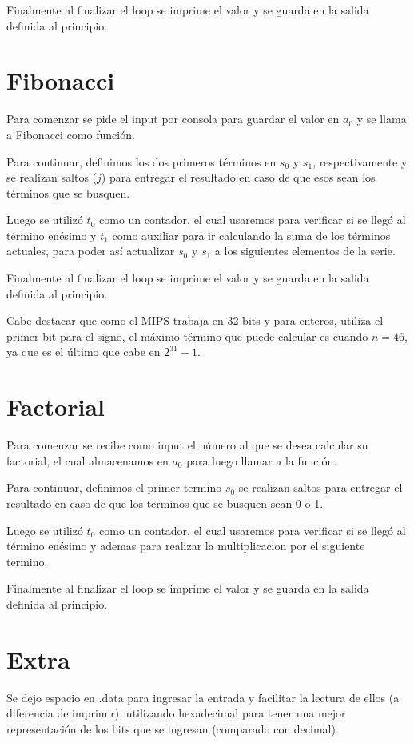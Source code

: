 \documentclass[11pt,letterpaper]{article}
\begin{document}
Finalmente al finalizar el loop se imprime el valor y se guarda en la salida definida al principio.


\section{Fibonacci}
Para comenzar se pide el input por consola para guardar el valor en $a_0$ y se llama a Fibonacci como función.

Para continuar, definimos los dos primeros términos en $s_0$ y $s_1$, respectivamente y se realizan saltos ($j$) para entregar el resultado en caso de que esos sean los términos que se busquen.

Luego se utilizó $t_0$ como un contador, el cual usaremos para verificar si se llegó al término enésimo y $t_1$ como auxiliar para ir calculando la suma de los términos actuales, para poder así actualizar $s_0$ y $s_1$ a los siguientes elementos de la serie.

Finalmente al finalizar el loop se imprime el valor y se guarda en la salida definida al principio.

Cabe destacar que como el MIPS trabaja en 32 bits y para enteros, utiliza el primer bit para el signo, el máximo término que puede calcular es cuando $n=46$, ya que es el último que cabe en $2^{31}-1$.

\section{Factorial}
Para comenzar se recibe como input el número al que se desea calcular su factorial, el cual almacenamos en $a_0$ para luego llamar a la función. 

Para continuar, definimos el primer termino  $s_0$ se realizan saltos para entregar el resultado en caso de que los terminos que se busquen sean 0 o 1.

Luego se utilizó $t_0$ como un contador, el cual usaremos para verificar si se llegó al término enésimo y ademas para realizar la multiplicacion por el siguiente termino.

Finalmente al finalizar el loop se imprime el valor y se guarda en la salida definida al principio.



\section{Extra}
Se dejo espacio en .data para ingresar la entrada y facilitar la lectura de ellos (a diferencia de imprimir), utilizando hexadecimal para tener una mejor representación de los bits que se ingresan (comparado con decimal). 
\end{document}
